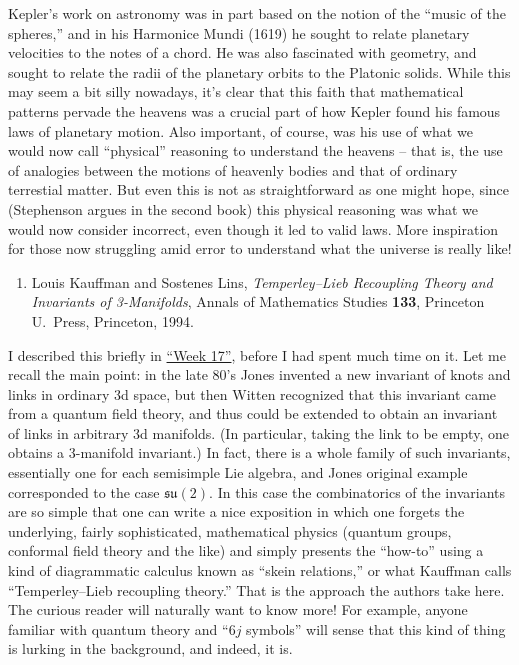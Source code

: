 \documentclass[12pt]{article}
\def\tightlist{}
\begin{document}
Kepler's work on astronomy was in part based on the notion of the
``music of the spheres,'' and in his Harmonice Mundi (1619) he sought to
relate planetary velocities to the notes of a chord. He was also
fascinated with geometry, and sought to relate the radii of the
planetary orbits to the Platonic solids. While this may seem a bit silly
nowadays, it's clear that this faith that mathematical patterns pervade
the heavens was a crucial part of how Kepler found his famous laws of
planetary motion. Also important, of course, was his use of what we
would now call ``physical'' reasoning to understand the heavens -- that
is, the use of analogies between the motions of heavenly bodies and that
of ordinary terrestial matter. But even this is not as straightforward
as one might hope, since (Stephenson argues in the second book) this
physical reasoning was what we would now consider incorrect, even though
it led to valid laws. More inspiration for those now struggling amid
error to understand what the universe is really like!

\begin{enumerate}
\def\labelenumi{\arabic{enumi})}
\setcounter{enumi}{2}
\tightlist
\item
  Louis Kauffman and Sostenes Lins, 
  \emph{Temperley--Lieb Recoupling Theory and Invariants of 3-Manifolds},
  Annals of Mathematics Studies
  \textbf{133}, Princeton U.\ Press, Princeton, 1994.
\end{enumerate}

I described this briefly in \protect\hyperlink{week17}{``Week 17''},
before I had spent much time on it. Let me recall the main point: in the
late 80's Jones invented a new invariant of knots and links in ordinary
3d space, but then Witten recognized that this invariant came from a
quantum field theory, and thus could be extended to obtain an invariant
of links in arbitrary 3d manifolds. (In particular, taking the link to
be empty, one obtains a 3-manifold invariant.) In fact, there is a whole
family of such invariants, essentially one for each semisimple Lie
algebra, and Jones original example corresponded to the case
\(\mathfrak{su}(2)\). In this case the combinatorics of the invariants
are so simple that one can write a nice exposition in which one forgets
the underlying, fairly sophisticated, mathematical physics (quantum
groups, conformal field theory and the like) and simply presents the
``how-to'' using a kind of diagrammatic calculus known as ``skein
relations,'' or what Kauffman calls ``Temperley--Lieb recoupling
theory.'' That is the approach the authors take here. The curious reader
will naturally want to know more! For example, anyone familiar with
quantum theory and ``\(6j\) symbols'' will sense that this kind of thing
is lurking in the background, and indeed, it is.
\end{document}

